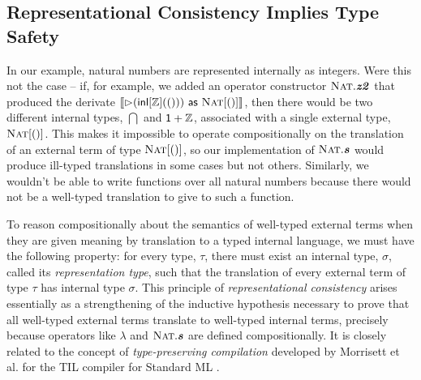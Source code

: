 \documentclass[9pt,preprint]{sigplanconf}
\begin{document}
\subsection{Representational Consistency Implies Type Safety}
In our example, natural numbers are represented internally as integers. Were this not the case -- if, for example, we added an operator constructor $\textsc{Nat}.\textbf{\textit{z2}}$ that produced the derivate $\llbracket \rhd({\sf inl}[\mathbb{Z}](()))~{\sf as}~\textsc{Nat}[()] \rrbracket$, then there would be two different internal types, $\dint$ and $\textsf{1} + \mathbb{Z}$,  associated with a single external type, $\textsc{Nat}[()]$. This makes it impossible to operate compositionally on the translation of an external term of type $\textsc{Nat}[()]$, so our implementation of $\textsc{Nat}.\textbf{\textit{s}}$ would produce ill-typed translations in some cases but not others. Similarly, we wouldn't be able to write functions over all natural numbers because there would not be a well-typed translation to give to such a function.

To reason compositionally about the semantics of well-typed external terms when they are given meaning by translation to a typed internal language, we must have the following property: for every  type, $\tau$, there must exist an internal type, $\sigma$, called its \emph{representation type}, such that the translation of every external term of type $\tau$ has internal type $\sigma$. This principle of \emph{representational consistency} arises essentially as a strengthening of the inductive hypothesis necessary to prove that all well-typed external terms translate to well-typed internal terms, precisely because operators like $\lambda$ and $\textsc{Nat}.\textbf{\textit{s}}$ are defined compositionally. It is closely related to the concept of \emph{type-preserving compilation} developed by Morrisett et al. for the TIL compiler for Standard ML \cite{TIL}. %
\end{document}
